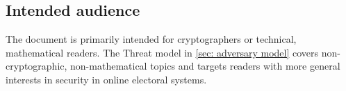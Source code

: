 \subsection{Intended audience}
The document is primarily intended for cryptographers or technical, mathematical readers. The Threat model in \cref{sec: adversary model} covers non-cryptographic, non-mathematical topics and targets readers with more general interests in security in online electoral systems.
